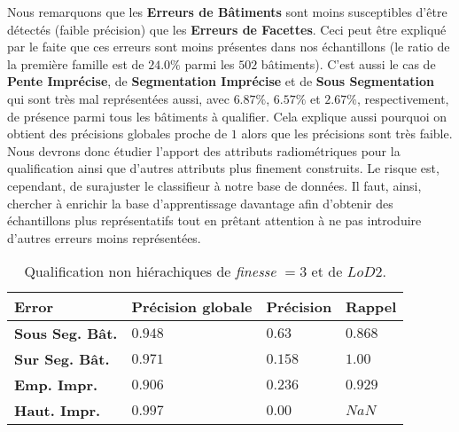 \documentclass[a4paper,french]{article}
\begin{document}
    {\tiny
        \begin{table}[H]
            \begin{minipage}{.48\linewidth}
                Nous remarquons que les \textbf{Erreurs de Bâtiments} sont moins susceptibles d'être détectés (faible précision) que les \textbf{Erreurs de Facettes}. Ceci peut être expliqué par le faite que ces erreurs sont moins présentes dans nos échantillons (le ratio de la première famille est de $24.0\%$ parmi les $502$ bâtiments). C'est aussi le cas de \textbf{Pente Imprécise}, de \textbf{Segmentation Imprécise} et de \textbf{Sous Segmentation} qui sont très mal représentées aussi, avec $6.87\%$, $6.57\%$ et $2.67\%$, respectivement, de présence parmi tous les bâtiments à qualifier. Cela explique aussi pourquoi on obtient des précisions globales proche de $1$ alors que les précisions sont très faible.\\
                Nous devrons donc étudier l'apport des attributs radiométriques pour la qualification ainsi que d'autres attributs plus finement construits. Le risque est, cependant, de surajuster le classifieur à notre base de données. Il faut, ainsi, chercher à enrichir la base d'apprentissage davantage afin d'obtenir des échantillons plus représentatifs tout en prêtant attention à ne pas introduire d'autres erreurs moins représentées.
            \end{minipage}
            \begin{minipage}{.46\linewidth}
                \begin{center}
                    \caption{\label{tab::multilab_d3}Qualification non hiérachiques de \emph{finesse} $ = 3$ et de $LoD 2$.}
                    \begin{tabular}{x{2.5cm} x{1cm} x{1cm} x{1cm}}
                        \toprule
                        {\bf Error} & {\bf Précision globale} & {\bf Précision} & {\bf Rappel} \\
                        \midrule
                        \textbf{Sous Seg. Bât.} & $0.948$ & $0.63$ & $0.868$ \\
                        \midrule
                        \textbf{Sur Seg. Bât.} & $0.971$ & $0.158$ & $1.00$ \\
                        \midrule
                        \textbf{Emp. Impr.} & $0.906$ & $0.236$ & $0.929$ \\
                        \midrule
                        \textbf{Haut. Impr.} & $0.997$ & $0.00$ & $NaN$ \\
                        \midrule

\end{tabular}
\end{center}
\end{minipage}
\end{table}}
\end{document}
